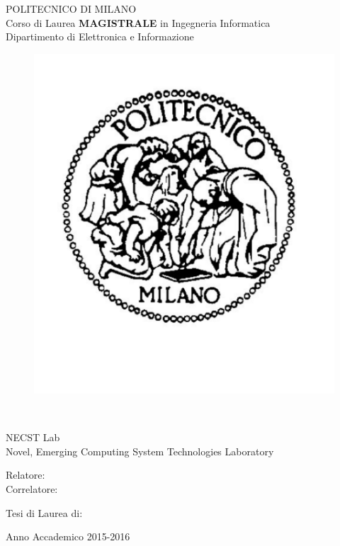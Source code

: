\thispagestyle{empty}
\vspace*{-1.5cm} \bfseries{
\begin{center}
	
	\large
  		POLITECNICO DI MILANO\\
  	
  	\normalsize
  		Corso di Laurea \textbf{MAGISTRALE} in Ingegneria Informatica\\
  		Dipartimento di Elettronica e Informazione\\
  		
  	\begin{figure}[htbp]
   		\begin{center}
      		\includegraphics [width = 3.5 cm]{./pictures/logopm}
    	\end{center}
  	\end{figure}
  	
\end{center}

\vspace*{2 cm}
\begin{center}
  	
  	\vspace*{0.3 cm} \LARGE

	\textbf{}\\

	\vspace*{.75 true cm} \large
  
  		NECST Lab \\
  		Novel, Emerging Computing System Technologies Laboratory\\
  		
\end{center}

\vspace*{3.0 cm} \large

\begin{minipage}[b]{.45\linewidth}
	\begin{flushleft}
  		Relatore: \\
  		Correlatore: \\ 
	\end{flushleft}
\end{minipage}
\begin{minipage}[b]{.45\linewidth}
	\begin{flushright}
  		Tesi di Laurea di:\\ 
	\end{flushright}
\end{minipage}

\vspace*{0.5 cm}

\begin{center}
	Anno Accademico 2015-2016
\end{center} \clearpage

}
